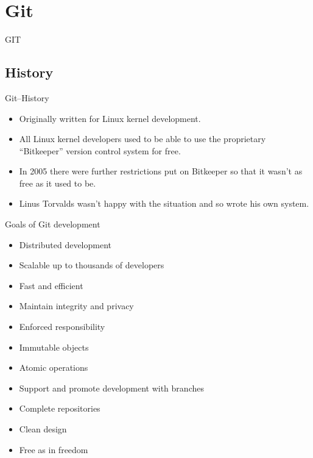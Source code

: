 \section{Git}

\begin{frame}
\begin{center}
\vspace{5em}
\Huge GIT
\end{center}
\end{frame}
\subsection{History}
\begin{frame}{Git--History}
\begin{itemize}
    \item Originally written for Linux kernel development.
    \item All Linux kernel developers used to be able to use the proprietary
	``Bitkeeper'' version control system for free.
    \item In 2005 there were further restrictions put on Bitkeeper so that
	it wasn't as free as it used to be.
    \item Linus Torvalds wasn't happy with the situation and so wrote his
	own system.
\end{itemize}
\end{frame}

\begin{frame}{Goals of Git development}
\begin{itemize}
    \item Distributed development
    \item Scalable up to thousands of developers
    \item Fast and efficient
    \item Maintain integrity and privacy
    \item Enforced responsibility
    \item Immutable objects
    \item Atomic operations
    \item Support and promote development with branches
    \item Complete repositories
    \item Clean design
    \item Free as in freedom
\end{itemize}
\end{frame}

